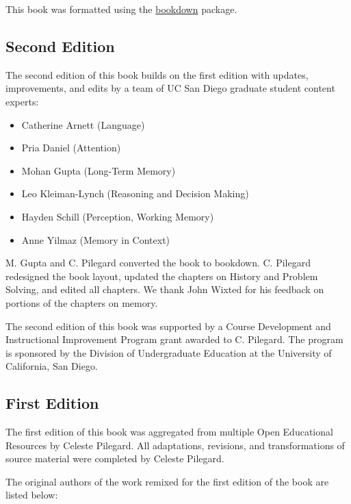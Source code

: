 \documentclass[
]{krantz}
\providecommand{\tightlist}{%
  \setlength{\itemsep}{0pt}\setlength{\parskip}{0pt}}
\begin{document}
This book was formatted using the \href{https://bookdown.org/}{bookdown} package.

\hypertarget{second-edition}{%
\subsection*{Second Edition}\label{second-edition}}


The second edition of this book builds on the first edition with updates, improvements, and edits by a team of UC San Diego graduate student content experts:

\begin{itemize}
\tightlist
\item
  Catherine Arnett (Language)
\item
  Pria Daniel (Attention)
\item
  Mohan Gupta (Long-Term Memory)
\item
  Leo Kleiman-Lynch (Reasoning and Decision Making)
\item
  Hayden Schill (Perception, Working Memory)
\item
  Anne Yilmaz (Memory in Context)
\end{itemize}

M. Gupta and C. Pilegard converted the book to bookdown. C. Pilegard redesigned the book layout, updated the chapters on History and Problem Solving, and edited all chapters. We thank John Wixted for his feedback on portions of the chapters on memory.

The second edition of this book was supported by a Course Development and Instructional Improvement Program grant awarded to C. Pilegard. The program is sponsored by the Division of Undergraduate Education at the University of California, San Diego.

\hypertarget{first-edition}{%
\subsection*{First Edition}\label{first-edition}}


The first edition of this book was aggregated from multiple Open Educational Resources by Celeste Pilegard. All adaptations, revisions, and transformations of source material were completed by Celeste Pilegard.

The original authors of the work remixed for the first edition of the book are listed below:
\end{document}
